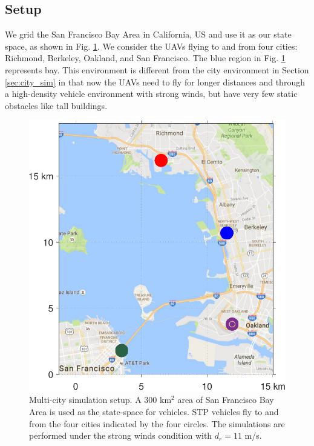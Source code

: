 \subsection{Setup \label{sec:bayArea_simSetup}}
We grid the San Francisco Bay Area in California, US and use it as our state space, as shown in Fig. \ref{fig:bayArea_setup}. We consider the UAVs flying to and from four cities: Richmond, Berkeley, Oakland, and San Francisco. The blue region in Fig. \ref{fig:bayArea_setup} represents bay. This environment is different from the city environment in Section \ref{sec:city_sim} in that now the UAVs need to fly for longer distances and through a high-density vehicle environment with strong winds, but have very few static obstacles like tall buildings.    
%
\begin{figure}
  \centering
  \includegraphics[width=\columnwidth]{figs/bayArea_setup}
  \caption{Multi-city simulation setup. A $300$ km$^2$ area of San Francisco Bay Area is used as the state-space for vehicles. STP vehicles fly to and from the four cities indicated by the four circles. The simulations are performed under the strong winds condition with $d_{r} = 11$ m/s.}
  \label{fig:bayArea_setup}
\end{figure}

